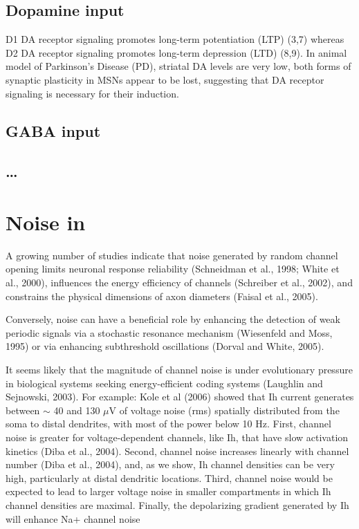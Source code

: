 \subsection{Dopamine input}


D1 DA receptor signaling promotes long-term potentiation (LTP) (3,7) whereas D2
DA receptor signaling promotes long-term depression (LTD) (8,9).
In animal model of Parkinson's Disease (PD), striatal DA levels are very low,
both forms of synaptic plasticity in MSNs appear to be lost, suggesting that DA
receptor signaling is necessary for their induction.




\subsection{GABA input}

\subsection{\ldots}

\section{Noise in }

A growing number of studies indicate that noise generated by random channel
opening limits neuronal response reliability (Schneidman et al., 1998; White et
al., 2000), influences the energy efficiency of channels (Schreiber et al.,
2002), and constrains the physical dimensions of axon diameters (Faisal et al.,
2005).

Conversely, noise can have a beneficial role by enhancing the
detection of weak periodic signals via a stochastic resonance
mechanism (Wiesenfeld and Moss, 1995) or via enhancing subthreshold
oscillations (Dorval and White, 2005).

It seems likely that the magnitude of channel noise is under evolutionary
pressure in biological systems seeking energy-efficient coding systems (Laughlin
and Sejnowski, 2003). For example: Kole et al (2006) showed that Ih current
generates between $\sim$ 40 and 130 $\mu$V of voltage noise (rms) spatially
distributed from the soma to distal dendrites, with most of the power below 10
Hz. First,
channel noise is greater for voltage-dependent channels, like Ih,
that have slow activation kinetics (Diba et al., 2004). Second,
channel noise increases linearly with channel number (Diba et al.,
2004), and, as we show, Ih channel densities can be very high,
particularly at distal dendritic locations. Third, channel
noise would be expected to lead to larger voltage noise in smaller
compartments in which Ih channel densities are maximal. Finally,
the depolarizing gradient generated by Ih will enhance Na+ channel
noise


